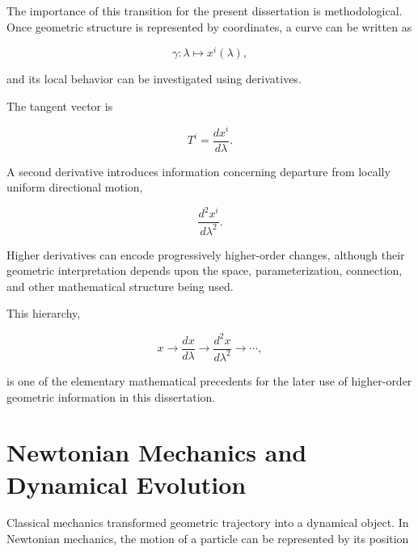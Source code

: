 \documentclass[12pt,oneside]{book}
\begin{document}
The importance of this transition for the present dissertation
is methodological. Once geometric structure is represented by
coordinates, a curve can be written as

\begin{equation}
    \gamma:
    \lambda
    \longmapsto
    x^i(\lambda),
    \label{eq:parametric-curve-history}
\end{equation}

and its local behavior can be investigated using derivatives.

The tangent vector is

\begin{equation}
    T^i
    =
    \frac{dx^i}{d\lambda}.
    \label{eq:historical-tangent}
\end{equation}

A second derivative introduces information concerning departure
from locally uniform directional motion,

\begin{equation}
    \frac{d^2x^i}{d\lambda^2}.
    \label{eq:historical-second-derivative}
\end{equation}

Higher derivatives can encode progressively higher-order
changes, although their geometric interpretation depends upon
the space, parameterization, connection, and other mathematical
structure being used.

This hierarchy,

\begin{equation}
    x
    \rightarrow
    \frac{dx}{d\lambda}
    \rightarrow
    \frac{d^2x}{d\lambda^2}
    \rightarrow
    \cdots,
    \label{eq:derivative-hierarchy}
\end{equation}

is one of the elementary mathematical precedents for the later
use of higher-order geometric information in this dissertation.


\section{Newtonian Mechanics and Dynamical Evolution}
\label{sec:newtonian-mechanics}

Classical mechanics transformed geometric trajectory into a
dynamical object. In Newtonian mechanics, the motion of a
particle can be represented by its position
\end{document}
